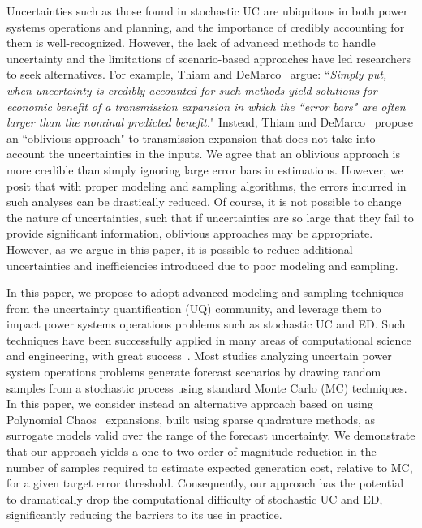 \documentclass[conference]{IEEEtran}
\begin{document}
Uncertainties such as those found in stochastic UC are ubiquitous in
both power systems operations and planning, and the importance of
credibly accounting for them is well-recognized. However, the lack of
advanced methods to handle uncertainty  and the limitations of
scenario-based approaches have led researchers  to seek
alternatives. For example, Thiam and DeMarco~\cite{Thiam:2010} argue:
``{\it Simply put, when uncertainty is credibly accounted for such
  methods yield solutions for economic benefit of a transmission
  expansion in which the ``error bars" are often larger than the
  nominal predicted benefit.}"  Instead, Thiam and
DeMarco~\cite{Thiam:2010} propose an ``oblivious approach" to
transmission expansion that does not take into account the
uncertainties in the inputs. We agree that an oblivious approach is
more credible than simply ignoring large error bars in
estimations. However, we posit that with proper modeling and  sampling
algorithms, the errors incurred in such analyses can be  drastically
reduced. Of course, it is not possible to change the nature of
uncertainties, such that if uncertainties are so large that they fail
to provide significant information, oblivious approaches may be
appropriate. However, as we argue in this paper, it is possible to
reduce additional uncertainties and inefficiencies introduced due to
poor modeling and sampling.

In this paper, we propose to adopt advanced modeling and sampling techniques
from the uncertainty quantification (UQ) community, and leverage them to impact
power systems operations problems such as stochastic UC and ED. Such techniques
have been successfully applied in many areas of computational science and
engineering, with great success~\cite{Najm:2009a}.  Most studies analyzing
uncertain power system operations problems generate forecast scenarios by
drawing random samples from a stochastic process using standard Monte Carlo (MC)
techniques. In this paper, we consider instead an alternative approach based on
using Polynomial Chaos~\cite{Ghanem:1991} expansions, built using sparse
quadrature methods, as surrogate models valid over the range of the forecast
uncertainty. We demonstrate that our approach yields a one to two order of
magnitude reduction in the number of samples required to estimate expected
generation cost, relative to MC, for a given target error threshold. Consequently, 
our approach has the potential to dramatically drop the computational difficulty of
stochastic UC and ED, significantly reducing the barriers to its use in
practice.
\end{document}

